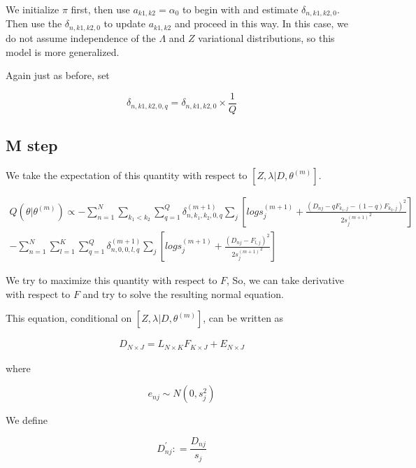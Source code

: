 \documentclass[11pt,authoryear]{article}
\begin{document}
We initialize $\pi$  first, then use $a_{k1,k2}=\alpha_0$  to begin with and estimate $\delta_{n,k1,k2,0}$. Then use the $\delta_{n,k1,k2,0}$ to update $a_{k1,k2}$  and proceed in this way. In this case, we do not assume independence of the $\Lambda$ and $Z$ variational distributions, so this model is more generalized.

Again just as before, set 

$$ \delta_{n,k1,k2,0, q} = \delta_{n,k1,k2,0} \times \frac{1}{Q}  $$



\subsection{M step}


%
%
%
%
We take the expectation of this quantity with respect to $\left [ Z, \lambda | D, \theta^{(m)} \right ]$.

\begin{eqnarray}
 Q (\theta | \theta^{(m)}) \propto - \sum_{n=1}^{N} \sum_{k_1 < k_2} \sum_{q=1}^{Q} \delta^{(m+1)}_{n, k_1, k_2, 0, q}  \sum_{j} \left [ log s^{(m+1)}_{j} + \frac{(D_{nj} - q F_{k_1,j} - (1-q) F_{k_2,j})^2}{2{s_j^{(m+1)}}^2} \right] \\
 -   \sum_{n=1}^{N} \sum_{l=1}^{K} \sum_{q=1}^{Q} \delta^{(m+1)}_{n, 0, 0, l, q}  \sum_{j} \left [ log s^{(m+1)}_{j} + \frac{(D_{nj} - F_{l,j})^2}{2{s_j^{(m+1)}}^2} \right] 
\end{eqnarray}

We try to maximize this quantity with respect to $F$, So, we can take derivative with respect to $F$ and try to solve the resulting normal equation.

This equation, conditional on $\left [ Z, \lambda | D, \theta^{(m)} \right ]$, can be written as 

\begin{eqnarray}
 D_{N \times J} = L_{N \times K} F_{K \times J} + E_{N \times J}
\end{eqnarray}

where 

$$ e_{nj} \sim N(0, s^2_{j}) $$

We define 

$$ D^{'}_{nj} : = \frac{D_{nj}}{s_{j}} $$
\end{document}
